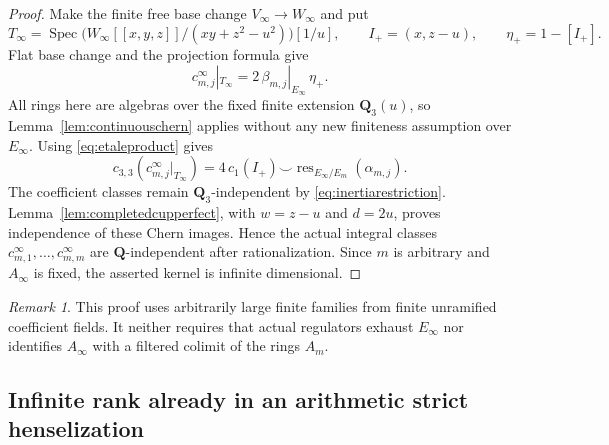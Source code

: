 \documentclass[11pt,a4paper]{article}
\theoremstyle{remark}
\newtheorem{remark}[theorem]{Remark}
\newcommand{\Q}{\mathbf Q}
\newcommand{\Spec}{\operatorname{Spec}}
\begin{document}
\begin{proof}
Make the finite free base change $V_\infty\to W_\infty$ and put
\[
 T_\infty=\Spec
 \bigl(W_\infty[[x,y,z]]/(xy+z^2-u^2)\bigr)[1/u],
 \qquad I_+=(x,z-u),\qquad \eta_+=1-[I_+].
\]
Flat base change and the projection formula give
\[
 c^\infty_{m,j}|_{T_\infty}
      =2\,\beta_{m,j}|_{E_\infty}\,\eta_+.
\]
All rings here are algebras over the fixed finite extension
$\Q_3(u)$, so Lemma~\ref{lem:continuouschern} applies without any
new finiteness assumption over $E_\infty$.
Using \eqref{eq:etaleproduct} gives
\[
 c_{3,3}(c^\infty_{m,j}|_{T_\infty})
   =4\,c_1(I_+)\smile
       \operatorname{res}_{E_\infty/E_m}(\alpha_{m,j}).
\]
The coefficient classes remain $\Q_3$-independent by
\eqref{eq:inertiarestriction}. Lemma~\ref{lem:completedcupperfect},
with $w=z-u$ and $d=2u$, proves independence of these Chern images.
Hence the actual integral classes $c^\infty_{m,1},\ldots,
c^\infty_{m,m}$ are $\Q$-independent after rationalization.
Since $m$ is arbitrary and $A_\infty$ is fixed, the asserted kernel
is infinite dimensional.
\end{proof}

\begin{remark}
This proof uses arbitrarily large finite families from finite
unramified coefficient fields. It neither requires that actual
regulators exhaust $E_\infty$ nor identifies $A_\infty$ with a
filtered colimit of the rings $A_m$.
\end{remark}



\subsection{Infinite rank already in an arithmetic strict henselization}
\label{sec:stricthenseldescent}
\end{document}
